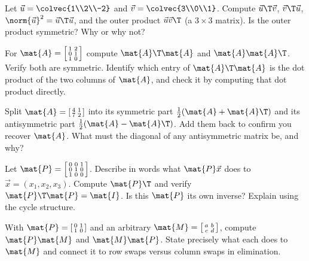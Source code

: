 \begin{exercise}\label{ch10:ex-dotprod}
Let $\vec{u}=\colvec{1\\2\\-2}$ and $\vec{v}=\colvec{3\\0\\1}$. Compute $\vec{u}\T\vec{v}$,
$\vec{v}\T\vec{u}$, $\norm{\vec{u}}^2=\vec{u}\T\vec{u}$, and the outer product $\vec{u}\vec{v}\T$
(a $3\times 3$ matrix). Is the outer product symmetric? Why or why not?
\end{exercise}

\begin{exercise}\label{ch10:ex-gram}
For $\mat{A}=\left[\begin{smallmatrix}1&2\\0&1\\1&0\end{smallmatrix}\right]$ compute $\mat{A}\T\mat{A}$
and $\mat{A}\mat{A}\T$. Verify both are symmetric. Identify which entry of $\mat{A}\T\mat{A}$ is the
dot product of the two columns of $\mat{A}$, and check it by computing that dot product directly.
\end{exercise}

\begin{exercise}\label{ch10:ex-split}
Split $\mat{A}=\left[\begin{smallmatrix}4&1\\7&2\end{smallmatrix}\right]$ into its symmetric part
$\tfrac12(\mat{A}+\mat{A}\T)$ and its antisymmetric part $\tfrac12(\mat{A}-\mat{A}\T)$. Add them back
to confirm you recover $\mat{A}$. What must the diagonal of any antisymmetric matrix be, and why?
\end{exercise}

\begin{exercise}\label{ch10:ex-permaction}
Let $\mat{P}=\left[\begin{smallmatrix}0&0&1\\0&1&0\\1&0&0\end{smallmatrix}\right]$. Describe in words
what $\mat{P}\vec{x}$ does to $\vec{x}=(x_1,x_2,x_3)$. Compute $\mat{P}\T$ and verify
$\mat{P}\T\mat{P}=\mat{I}$. Is this $\mat{P}$ its own inverse? Explain using the cycle structure.
\end{exercise}

\begin{exercise}\label{ch10:ex-leftright}
With $\mat{P}=\left[\begin{smallmatrix}0&1\\1&0\end{smallmatrix}\right]$ and an arbitrary
$\mat{M}=\left[\begin{smallmatrix}a&b\\c&d\end{smallmatrix}\right]$, compute $\mat{P}\mat{M}$ and
$\mat{M}\mat{P}$. State precisely what each does to $\mat{M}$ and connect it to row swaps versus
column swaps in elimination.
\end{exercise}

